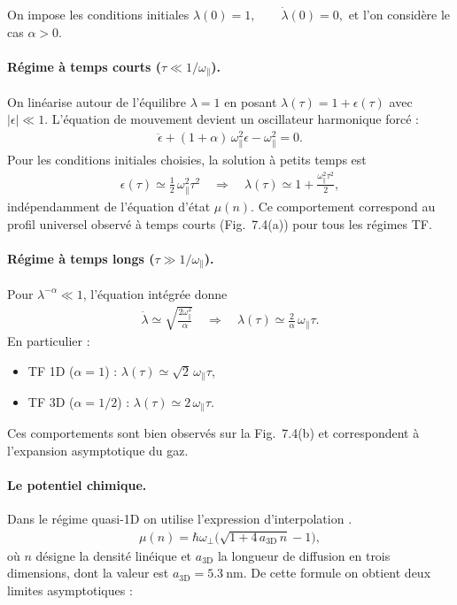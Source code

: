 \medskip

On impose les conditions initiales
\(
\lambda(0)=1, \qquad \dot\lambda(0)=0,
\)
et l'on considère le cas \(\alpha>0\).

\medskip

\paragraph{Régime à temps courts (\(\tau \ll 1/\omega_\parallel\)).}  
On linéarise autour de l'équilibre \(\lambda=1\) en posant \(\lambda(\tau)=1+\epsilon(\tau)\) avec \(|\epsilon|\ll 1\). L'équation de mouvement devient un oscillateur harmonique forcé :
\begin{eqnarray}
\ddot \epsilon + (1+\alpha)\,\omega_\parallel^2 \epsilon - \omega_\parallel^2 = 0.
\end{eqnarray}
Pour les conditions initiales choisies, la solution à petits temps est
\begin{eqnarray}
\epsilon(\tau) \simeq \frac{1}{2}\,\omega_\parallel^2 \tau^2 \quad\Rightarrow\quad
\lambda(\tau) \simeq 1 + \frac{\omega_\parallel^2 \tau^2}{2},
\end{eqnarray}
indépendamment de l'équation d'état \(\mu(n)\). Ce comportement correspond au profil universel observé à temps courts (Fig.~7.4(a)) pour tous les régimes TF.

\paragraph{Régime à temps longs (\(\tau \gg 1/\omega_\parallel\)).}  
Pour \(\lambda^{-\alpha}\ll 1\), l'équation intégrée donne
\begin{eqnarray}
\dot\lambda \simeq \sqrt{\frac{2\omega_\parallel^2}{\alpha}} \quad\Rightarrow\quad
\lambda(\tau) \simeq \frac{2}{\alpha}\,\omega_\parallel \tau.
\end{eqnarray}
En particulier :
\begin{itemize}[label = $\bullet$]
\item \gls{TF} 1D (\(\alpha=1\)) : \(\lambda(\tau)\simeq \sqrt{2}\,\omega_\parallel \tau\),  
\item \gls{TF} 3D (\(\alpha=1/2\)) : \(\lambda(\tau)\simeq 2\,\omega_\parallel \tau\).  
\end{itemize}
Ces comportements sont bien observés sur la Fig.~7.4(b) et correspondent à l’expansion asymptotique du gaz.


\paragraph{Le potentiel chimique.}
Dans le régime quasi-1D on utilise l'expression d'interpolation \cite{PhysRevA.68.043610}.
\begin{eqnarray}
	\mu(n)=\hbar\omega_\perp\Big(\sqrt{1+4\,a_{\mathrm{3D}}\,n}-1\Big),
\end{eqnarray}
où \(n\) désigne la densité linéique et \(a_{\mathrm{3D}}\) la longueur de diffusion en trois dimensions, dont la valeur est \(a_{\mathrm{3D}} = 5.3~\mathrm{nm}\). De cette formule on obtient deux limites asymptotiques :

